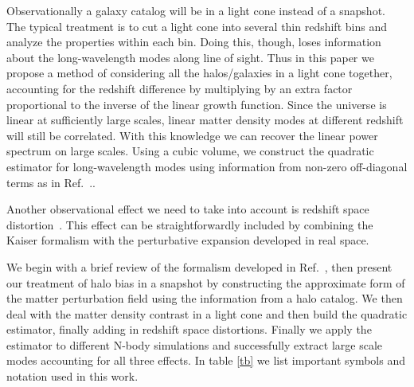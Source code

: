 \documentclass[prd,amsmath,amssymb,floatfix,superscriptaddress,nofootinbib,twocolumn]{revtex4-1}
\newcommand{\peikai}[1]{{\color{blue} #1}}
\begin{document}
Observationally a galaxy catalog will be in a light cone \cite{Carroll:1997gr} instead of a snapshot. The typical  treatment is to cut a light cone into several thin redshift bins \cite{Chuang:2016uuz} and analyze the properties within each bin. Doing this, though, loses information about the long-wavelength modes along line of sight. Thus in this paper we propose a method of considering all the halos/galaxies in a light cone together, accounting for the redshift difference by multiplying by an extra factor proportional to the inverse of the linear growth function. Since the universe is linear at sufficiently large scales, linear matter density modes at different redshift will still be correlated. With this knowledge we can recover the linear power spectrum on large scales. Using a cubic volume, we construct the quadratic estimator for long-wavelength modes using information from non-zero off-diagonal terms as in Ref.~.\cite{Li:2020fir}.

Another observational effect we need to take into account is redshift space distortion~\cite{Kaiser:1987rsd}. This effect can be straightforwardly included by combining the Kaiser formalism with the perturbative expansion developed in real space.

We begin with a brief review of the formalism developed in Ref.~\cite{Li:2020fir}, then present our treatment of halo bias in a snapshot by constructing the approximate form of the matter perturbation field using the information from a halo catalog. We then deal with the matter density contrast in a light cone and then build the quadratic estimator, finally adding in redshift space distortions. Finally we apply the estimator to different N-body simulations and successfully extract large scale modes accounting for all three effects. \peikai{In table \ref{tb} we list important symbols and notation used in this work.}
\clearpage
\end{document}
